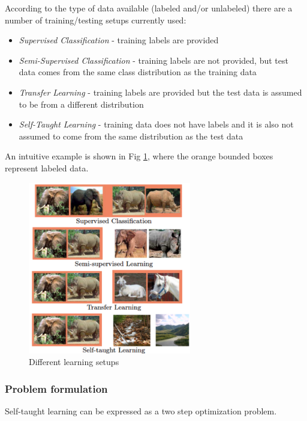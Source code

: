 \documentclass[10pt,journal,a4paper]{IEEEtran}
\begin{document}
According to the type of data available (labeled and/or unlabeled) there are a number of training/testing setups currently used:
\begin{itemize}
\item \textit{Supervised Classification} - training labels are provided
\item \textit{Semi-Supervised Classification} - training labels are not provided, but test data comes from the same class distribution as the training data
\item \textit{Transfer Learning} - training labels are provided but the test data is assumed to be from a different distribution
\item \textit{Self-Taught Learning} - training data does not have labels and it is also not assumed to come from the same distribution as the test data
\end{itemize}
An intuitive example is shown in Fig \ref{fig_sim}, where the orange bounded boxes represent labeled data.
\begin{figure}[!t]
\centering
\includegraphics[width=2.8in]{selftaught.png}
\caption{Different learning setups}
\label{fig_sim}
\end{figure}


\subsubsection{Problem formulation}
Self-taught learning can be expressed as a two step optimization problem.
\end{document}
